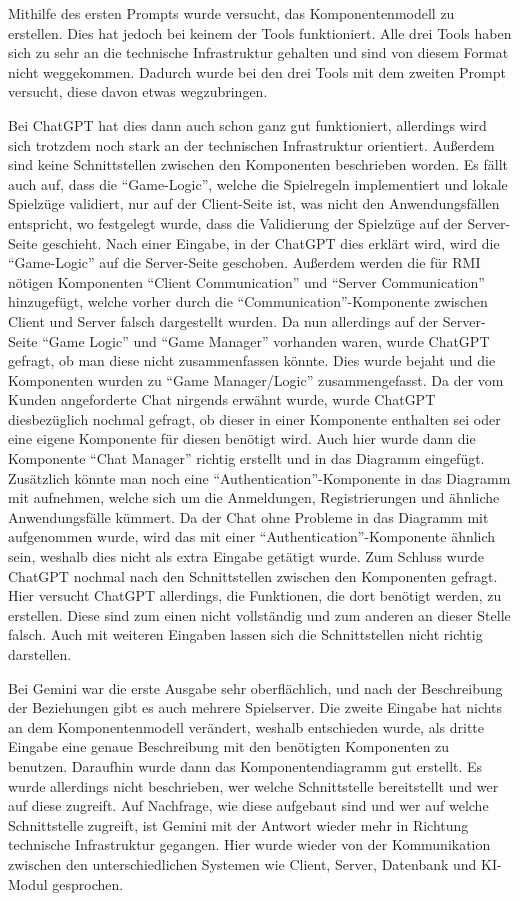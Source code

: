 Mithilfe des ersten Prompts wurde versucht, das Komponentenmodell zu erstellen. Dies hat jedoch bei keinem der Tools funktioniert. Alle drei Tools 
haben sich zu sehr an die technische Infrastruktur gehalten und sind von diesem Format nicht weggekommen. Dadurch wurde bei den drei Tools mit dem 
zweiten Prompt versucht, diese davon etwas wegzubringen.

Bei ChatGPT hat dies dann auch schon ganz gut funktioniert, allerdings wird sich trotzdem noch stark an der technischen Infrastruktur orientiert. 
Außerdem sind keine Schnittstellen zwischen den Komponenten beschrieben worden. Es fällt auch auf, dass die ``Game-Logic'', welche die Spielregeln 
implementiert und lokale Spielzüge validiert, nur auf der Client-Seite ist, was nicht den Anwendungsfällen entspricht, wo festgelegt wurde, dass 
die Validierung der Spielzüge auf der Server-Seite geschieht. Nach einer Eingabe, in der ChatGPT dies erklärt wird, wird die ``Game-Logic'' auf die 
Server-Seite geschoben. Außerdem werden die für RMI nötigen Komponenten ``Client Communication'' und ``Server Communication'' hinzugefügt, welche 
vorher durch die ``Communication''-Komponente zwischen Client und Server falsch dargestellt wurden. Da nun allerdings auf der Server-Seite ``Game Logic'' 
und ``Game Manager'' vorhanden waren, wurde ChatGPT gefragt, ob man diese nicht zusammenfassen könnte. Dies wurde bejaht und die Komponenten wurden 
zu ``Game Manager/Logic'' zusammengefasst. Da der vom Kunden angeforderte Chat nirgends erwähnt wurde, wurde ChatGPT diesbezüglich nochmal gefragt, 
ob dieser in einer Komponente enthalten sei oder eine eigene Komponente für diesen benötigt wird. Auch hier wurde dann die Komponente ``Chat Manager'' 
richtig erstellt und in das Diagramm eingefügt. Zusätzlich könnte man noch eine ``Authentication''-Komponente in das Diagramm mit aufnehmen, welche 
sich um die Anmeldungen, Registrierungen und ähnliche Anwendungsfälle kümmert. Da der Chat ohne Probleme in das Diagramm mit aufgenommen 
wurde, wird das mit einer ``Authentication''-Komponente ähnlich sein, weshalb dies nicht als extra Eingabe getätigt wurde. Zum Schluss 
wurde ChatGPT nochmal nach den Schnittstellen zwischen den Komponenten gefragt. Hier versucht ChatGPT allerdings, die Funktionen, die 
dort benötigt werden, zu erstellen. Diese sind zum einen nicht vollständig und zum anderen an dieser Stelle falsch. Auch mit weiteren 
Eingaben lassen sich die Schnittstellen nicht richtig darstellen.

Bei Gemini war die erste Ausgabe sehr oberflächlich, und nach der Beschreibung der Beziehungen gibt es auch mehrere Spielserver. Die 
zweite Eingabe hat nichts an dem Komponentenmodell verändert, weshalb entschieden wurde, als dritte Eingabe eine genaue Beschreibung 
mit den benötigten Komponenten zu benutzen. Daraufhin wurde dann das Komponentendiagramm gut erstellt. Es wurde allerdings nicht 
beschrieben, wer welche Schnittstelle bereitstellt und wer auf diese zugreift. Auf Nachfrage, wie diese aufgebaut sind und wer auf 
welche Schnittstelle zugreift, ist Gemini mit der Antwort wieder mehr in Richtung technische Infrastruktur gegangen. Hier wurde 
wieder von der Kommunikation zwischen den unterschiedlichen Systemen wie Client, Server, Datenbank und KI-Modul gesprochen.

